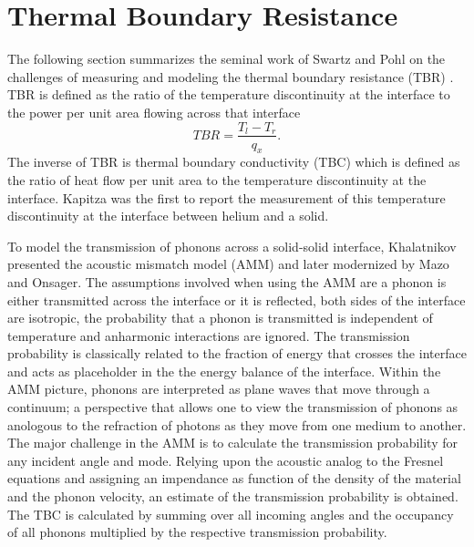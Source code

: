 \documentclass[aps,prb,preprint,preprintnumbers,amsmath,amssymb,floatfix,superscriptaddress]{revtex4}
\begin{document}
\section*{Thermal Boundary Resistance}
The following section summarizes the seminal work of Swartz and Pohl on the challenges of measuring and modeling the thermal boundary resistance (TBR) \cite{RevModPhys.61.605}. TBR is defined as the ratio of the temperature discontinuity at the interface to the power per unit area flowing across that interface
\begin{equation}
TBR=\frac{T_l-T_r}{q_x}.
\end{equation}
The inverse of TBR is thermal boundary conductivity (TBC) which is defined as the ratio of heat flow per unit area to the temperature discontinuity at the interface. Kapitza was the first to report the measurement of this temperature discontinuity at the interface between helium and a solid.

To model the transmission of phonons across a solid-solid interface, Khalatnikov presented the acoustic mismatch model (AMM) and later modernized by Mazo and Onsager. The assumptions involved when using the AMM are a phonon is either transmitted across the interface or it is reflected, both sides of the interface are isotropic, the probability that a phonon is transmitted is independent of temperature and anharmonic interactions are ignored. The transmission probability is classically related to the fraction of energy that crosses the interface and acts as placeholder in the the energy balance of the interface. Within the AMM picture, phonons are interpreted as plane waves that move through a continuum; a perspective that allows one to view the transmission of phonons as anologous to the refraction of photons as they move from one medium to another. The major challenge in the AMM is to calculate the transmission probability for any incident angle and mode. Relying upon the acoustic analog to the Fresnel equations and assigning an impendance as function of the density of the material and the phonon velocity, an estimate of the transmission probability is obtained. The TBC is calculated by summing over all incoming angles and the occupancy of all phonons multiplied by the respective transmission probability.
\end{document}
